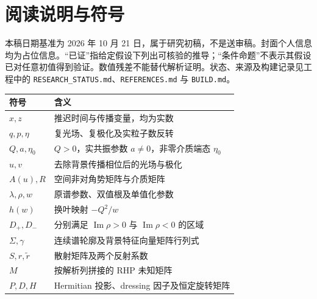 \chapter*{阅读说明与符号}
本稿日期基准为 2026 年 10 月 21 日，属于研究初稿，不是送审稿。封面个人信息均为占位信息。“已证”指给定假设下列出可核验的推导；“条件命题”不表示其假设已对任意初值得到验证。数值残差不能替代解析证明。状态、来源及构建记录见工程中的 \texttt{RESEARCH\_STATUS.md}、\texttt{REFERENCES.md} 与 \texttt{BUILD.md}。
\begin{longtable}{p{}p{}}
\toprule 符号 & 含义\\\midrule
$x,z$ & 推迟时间与传播变量，均为实数\\
$q,p,\eta$ & 复光场、复极化及实粒子数反转\\
$Q,a,\eta_0$ & $Q>0$，实共振参数 $a\ne0$，非零介质端态 $\eta_0$\\
$u,v$ & 去除背景传播相位后的光场与极化\\
$A(u),R$ & 空间非对角势矩阵与介质矩阵\\
$\lambda,\rho,w$ & 原谱参数、双值根及单值化参数\\
$h(w)$ & 换叶映射 $-Q^2/w$\\
$D_+,D_-$ & 分别满足 $\operatorname{Im}\rho>0$ 与 $\operatorname{Im}\rho<0$ 的区域\\
$\Sigma,\gamma$ & 连续谱轮廓及背景特征向量矩阵行列式\\
$S,r,\widetilde r$ & 散射矩阵及两个反射系数\\
$M$ & 按解析列拼接的 RHP 未知矩阵\\
$P,D,H$ & Hermitian 投影、dressing 因子及恒定旋转矩阵\\
\bottomrule
\end{longtable}
